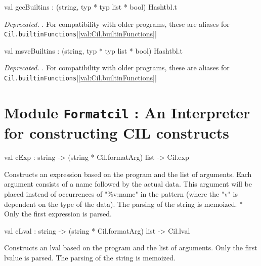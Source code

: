 \documentclass[11pt]{article}
\begin{document}
\label{val:Cil.gccBuiltins}\begin{ocamldoccode}
val gccBuiltins : (string, typ * typ list * bool) Hashtbl.t
\end{ocamldoccode}
\begin{ocamldocdescription}
{\it Deprecated. }.  For compatibility with older programs, these are
    aliases for {\tt{Cil.builtinFunctions}}[\ref{val:Cil.builtinFunctions}]
\end{ocamldocdescription}




\label{val:Cil.msvcBuiltins}\begin{ocamldoccode}
val msvcBuiltins : (string, typ * typ list * bool) Hashtbl.t
\end{ocamldoccode}
\begin{ocamldocdescription}
{\it Deprecated. }.  For compatibility with older programs, these are
  aliases for {\tt{Cil.builtinFunctions}}[\ref{val:Cil.builtinFunctions}]
\end{ocamldocdescription}


\section{Module {\tt{Formatcil}} : An Interpreter for constructing CIL constructs}
\label{module:Formatcil}




\ocamldocvspace{0.5cm}



\label{val:Formatcil.cExp}\begin{ocamldoccode}
val cExp : string -> (string * Cil.formatArg) list -> Cil.exp
\end{ocamldoccode}
\begin{ocamldocdescription}
Constructs an expression based on the program and the list of arguments. 
 Each argument consists of a name followed by the actual data. This 
 argument will be placed instead of occurrences of "\%v:name" in the pattern 
 (where the "v" is dependent on the type of the data). The parsing of the 
 string is memoized. * Only the first expression is parsed.


\end{ocamldocdescription}




\label{val:Formatcil.cLval}\begin{ocamldoccode}
val cLval : string -> (string * Cil.formatArg) list -> Cil.lval
\end{ocamldoccode}
\begin{ocamldocdescription}
Constructs an lval based on the program and the list of arguments. 
 Only the first lvalue is parsed. 
 The parsing of the string is memoized.


\end{ocamldocdescription}
\end{document}
